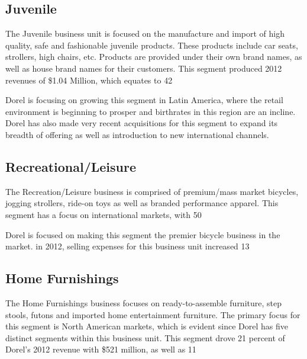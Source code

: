 \subsection{Juvenile}
The Juvenile business unit is focused on the manufacture and import of high quality, safe and fashionable juvenile products.  These products include car seats, strollers, high chairs, etc.  Products are provided under their own brand names, as well as house brand names for their customers. This segment produced 2012 revenues of \$1.04 Million, which equates to 42%

Dorel is focusing on growing this segment in Latin America, where the retail environment is beginning to prosper and birthrates in this region are an incline. Dorel has also made very recent acquisitions for this segment to expand its breadth of offering as well as introduction to new international channels.

\subsection{Recreational/Leisure}
The Recreation/Leisure business is comprised of premium/mass market bicycles, jogging strollers, ride-on toys as well as branded performance apparel.  This segment has a focus on international markets, with 50%

Dorel is focused on making this segment the premier bicycle business in the market. in 2012, selling expenses for this business unit increased 13%

\subsection{Home Furnishings}
The Home Furnishings business focuses on ready-to-assemble furniture, step stools, futons and imported home entertainment furniture.  The primary focus for this segment is North American markets, which is evident since Dorel has five distinct segments within this business unit. This segment drove 21 percent of Dorel’s 2012 revenue with \$521 million, as well as 11%

